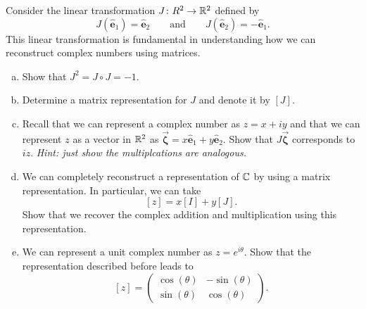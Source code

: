 \documentclass[12pt]{article} %
\newcommand{\ehat}{\boldsymbol{\hat{e}}}
\begin{document}
\begin{problem}
Consider the linear transformation $J \colon R^2 \to \mathbb{R}^2$ defined by
\[
J(\ehat_1) = \ehat_2 \qquad \textrm{and} \qquad J(\ehat_2) = -\ehat_1.
\]
This linear transformation is fundamental in understanding how we can reconstruct complex numbers using matrices.
\begin{enumerate}[(a)]
    \item Show that $J^2 = J\circ J= -1$.
    \item Determine a matrix representation for $J$ and denote it by $[J]$.
    \item Recall that we can represent a complex number as $z=x + iy$ and that we can represent $z$ as a vector in $\mathbb{R}^2$ as $\vec{\boldsymbol{\zeta}} = x\ehat_1 + y\ehat_2$.  Show that $J \vec{\boldsymbol{\zeta}}$ corresponds to $iz$. \emph{Hint: just show the multiplcations are analogous.}
    \item We can completely reconstruct a representation of $\mathbb{C}$ by using a matrix representation.  In particular, we can take
    \[
        [z] = x [I] + y [J].
    \]
    Show that we recover the complex addition and multiplication using this representation.
    \item We can represent a unit complex number as $z=e^{i\theta}$.  Show that the representation described before leads to
    \[
        [z] = \begin{pmatrix} \cos(\theta) & -\sin(\theta) \\ \sin(\theta) & \cos(\theta) \end{pmatrix}.
    \]
\end{enumerate}
%

\end{problem}
\end{document}
